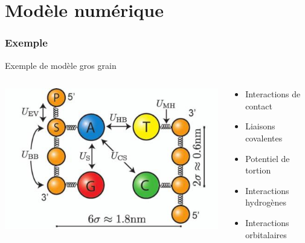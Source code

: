 \documentclass{beamer}
\begin{document}
\section{Modèle numérique}

 
\frame %
{
  \frametitle{Exemple}
\begin{center}
Exemple de modèle gros grain
\end{center}  
  
 \begin{columns}
 \begin{column}{0.6\textwidth}

\includegraphics[width=\textwidth]{moldyn2.jpg}
\end{column}
\begin{column}{0.4\textwidth}



\begin{itemize}

\item<2-> Interactions de contact 
\medskip


 \item<3-> Liaisons covalentes
 \medskip

 
 \item<4-> Potentiel de tortion
 \medskip
 
 \item<5-> Interactions hydrogènes
 \medskip
 
 \item<6-> Interactions orbitalaires
\end{itemize}




 
\end{column}


\end{columns}}
\end{document}
